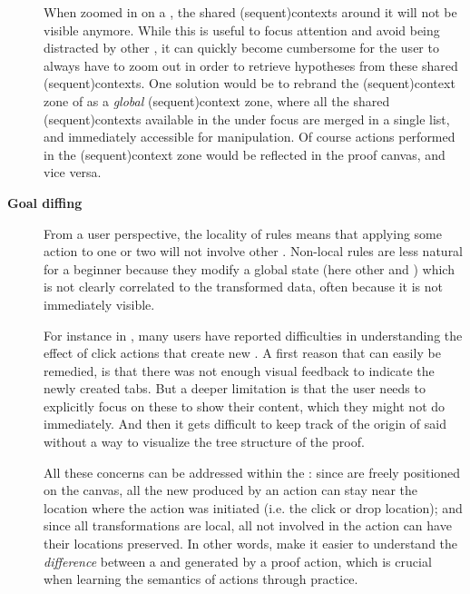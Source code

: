 \begin{scope}
\begin{description}
    When zoomed in on a , the shared \kl(sequent){contexts} around it will not be
    visible anymore. While this is useful to focus attention and avoid being
    distracted by other , it can quickly become cumbersome for the user
    to always have to zoom out in order to retrieve hypotheses from these shared
    \kl(sequent){contexts}. One solution would be to rebrand the \kl(sequent){context} zone of  as a
    \emph{global} \kl(sequent){context} zone, where all the shared \kl(sequent){contexts} available in the
     under focus are merged in a single list, and immediately accessible
    for manipulation. Of course actions performed in the \kl(sequent){context} zone would be
    reflected in the proof canvas, and vice versa.

  \item[\textbf{Goal diffing}] From a user perspective, the locality of rules
    means that applying some action to one or two  will not involve other
    .
    Non-local rules are less natural for a beginner because they modify a global
    state (here other  and ) which is not clearly correlated to the
    transformed data, often because it is not immediately visible.

    For instance in , many users have reported difficulties in
    understanding the effect of click actions that create new . A first
    reason that can easily be remedied, is that there was not enough visual
    feedback to indicate the newly created tabs. But a deeper limitation is that
    the user needs to explicitly focus on these  to show their content,
    which they might not do immediately. And then it gets difficult to keep
    track of the origin of said  without a way to visualize the tree
    structure of the proof.

    All these concerns can be addressed within the  :
    since  are  freely positioned on the canvas, all the
    new  produced by an action can stay near the location where the action
    was initiated (i.e. the click or drop location); and since all
    transformations are local, all  not involved in the action can have
    their locations preserved. In other words,  make it easier to
    understand the \emph{difference} between a  and 
    generated by a proof action, which is crucial when learning the semantics of
    actions through practice.
\end{description}


\end{scope}